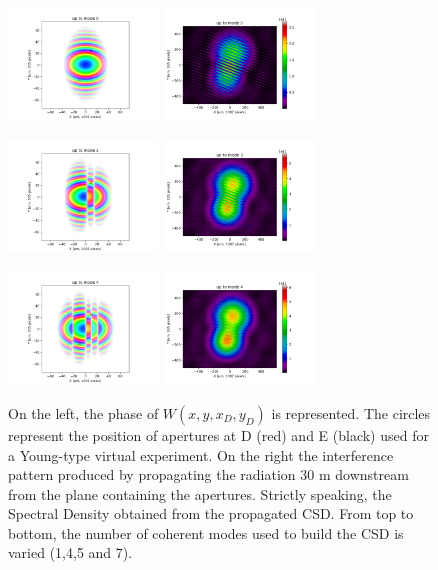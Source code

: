 \documentclass{iucr}              %
\begin{document}
\begin{figure}
\caption{On the left, the phase of $W(x,y,x_{D},y_{D})$ is represented. The circles represent the position of apertures at D (red) and E (black) used for a Young-type virtual experiment. On the right the interference pattern produced by propagating the radiation 30 m downstream from the plane containing the apertures. Strictly speaking, the Spectral Density obtained from the propagated CSD. From top to bottom, the number of coherent modes used to build the CSD is varied (1,4,5 and 7).}
\includegraphics[width=4cm]{Figures/interference_D_uptomode0000_csd.png}
\includegraphics[width=4cm]{Figures/interference_D_uptomode0000_pattern.png}

\includegraphics[width=4cm]{Figures/interference_D_uptomode0003_csd.png}
\includegraphics[width=4cm]{Figures/interference_D_uptomode0003_pattern.png}

\includegraphics[width=4cm]{Figures/interference_D_uptomode0004_csd.png}
\includegraphics[width=4cm]{Figures/interference_D_uptomode0004_pattern.png}


\end{figure}
\end{document}
